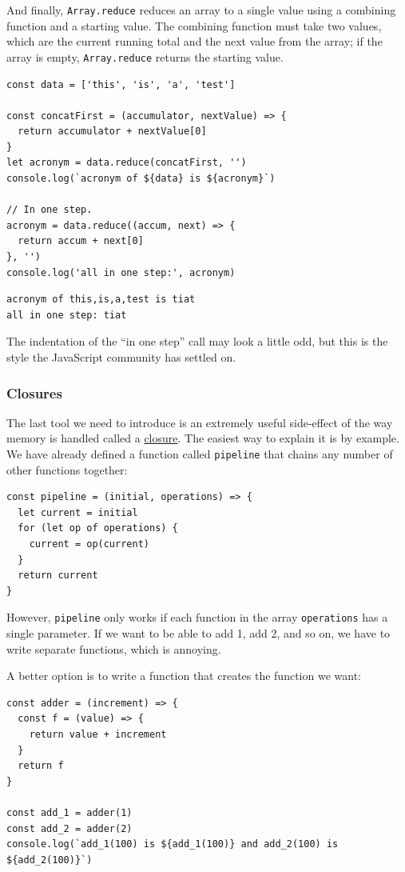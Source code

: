 And finally, \texttt{Array.reduce} reduces an array to a single value
using a combining function and a starting value. The combining function
must take two values, which are the current running total and the next
value from the array; if the array is empty, \texttt{Array.reduce}
returns the starting value.

\begin{verbatim}
const data = ['this', 'is', 'a', 'test']

const concatFirst = (accumulator, nextValue) => {
  return accumulator + nextValue[0]
}
let acronym = data.reduce(concatFirst, '')
console.log(`acronym of ${data} is ${acronym}`)

// In one step.
acronym = data.reduce((accum, next) => {
  return accum + next[0]
}, '')
console.log('all in one step:', acronym)
\end{verbatim}

\begin{verbatim}
acronym of this,is,a,test is tiat
all in one step: tiat
\end{verbatim}

The indentation of the ``in one step'' call may look a little odd, but
this is the style the JavaScript community has settled on.

\subsubsection{Closures}\label{s:callbacks-closures}

The last tool we need to introduce is an extremely useful side-effect of
the way memory is handled called a
\protect\hyperlink{g:closure}{closure}. The easiest way to explain it is
by example. We have already defined a function called \texttt{pipeline}
that chains any number of other functions together:

\begin{verbatim}
const pipeline = (initial, operations) => {
  let current = initial
  for (let op of operations) {
    current = op(current)
  }
  return current
}
\end{verbatim}

However, \texttt{pipeline} only works if each function in the array
\texttt{operations} has a single parameter. If we want to be able to add
1, add 2, and so on, we have to write separate functions, which is
annoying.

A better option is to write a function that creates the function we
want:

\begin{verbatim}
const adder = (increment) => {
  const f = (value) => {
    return value + increment
  }
  return f
}

const add_1 = adder(1)
const add_2 = adder(2)
console.log(`add_1(100) is ${add_1(100)} and add_2(100) is ${add_2(100)}`)
\end{verbatim}


